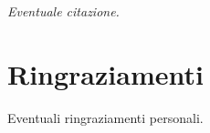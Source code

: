

\begin{flushright}{\slshape    
   Eventuale citazione.}\\ \medskip
\end{flushright}

\bigskip

\begingroup
\let\clearpage\relax
\let\cleardoublepage\relax
\let\cleardoublepage\relax
\chapter*{Ringraziamenti}

Eventuali ringraziamenti personali.
	


\endgroup



